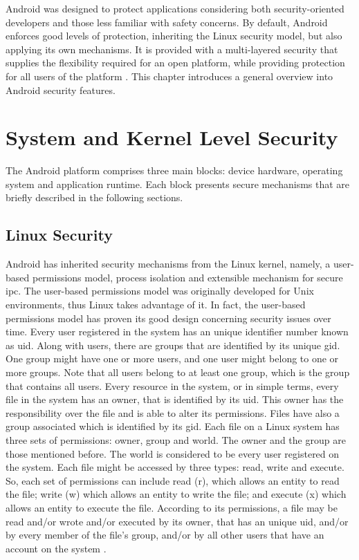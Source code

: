 Android was designed to protect applications considering both security-oriented developers and those less familiar with safety concerns. By default, Android enforces good levels of protection, inheriting the Linux security model, but also applying its own mechanisms. It is provided with a multi-layered security that supplies the flexibility required for an open platform, while providing protection for all users of the platform \cite{SecurityOverview:Android}. This chapter introduces a general overview into Android security features.

\section{System and Kernel Level Security}

The Android platform comprises three main blocks: device hardware, operating system and application runtime. Each block presents secure mechanisms that are briefly described in the following sections. 

\subsection{Linux Security}

Android has inherited security mechanisms from the Linux kernel, namely, a user-based permissions model, process isolation and extensible mechanism for secure \gls{ipc}. The user-based permissions model was originally developed for Unix environments, thus Linux takes advantage of it. In fact, the user-based permissions model has proven its good design concerning security issues over time. Every user registered in the system has an unique identifier number known as \gls{uid}. Along with users, there are groups that are identified by its unique \gls{gid}. One group might have one or more users, and one user might belong to one or more groups. Note that all users belong to at least one group, which is the group that contains all users. Every resource in the system, or in simple terms, every file in the system has an owner, that is identified by its \gls{uid}. This owner has the responsibility over the file and is able to alter its permissions. Files have also a group associated which is identified by its \gls{gid}. Each file on a Linux system has three sets of permissions: owner, group and world. The owner and the group are those mentioned before. The world is considered to be every user registered on the system. Each file might be accessed by three types: read, write and execute. So, each set of permissions can include read (r), which allows an entity to read the file; write (w) which allows an entity to write the file; and execute (x) which allows an entity to execute the file. According to its permissions, a file may be read and/or wrote and/or executed by its owner, that has an unique \gls{uid}, and/or by every member of the file's group, and/or by all other users that have an account on the system \cite{ComputerSecurity}.

